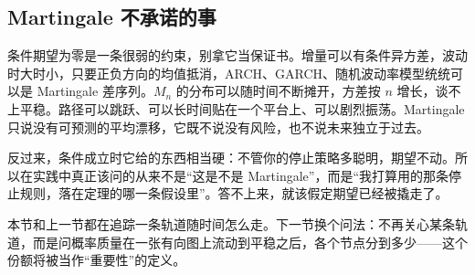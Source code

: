 \subsection{Martingale 不承诺的事}

条件期望为零是一条很弱的约束，别拿它当保证书。增量可以有条件异方差，波动时大时小，只要正负方向的均值抵消，ARCH、GARCH、随机波动率模型统统可以是 Martingale 差序列。\(M_n\) 的分布可以随时间不断摊开，方差按 \(n\) 增长，谈不上平稳。路径可以跳跃、可以长时间贴在一个平台上、可以剧烈振荡。Martingale 只说没有可预测的平均漂移，它既不说没有风险，也不说未来独立于过去。

反过来，条件成立时它给的东西相当硬：不管你的停止策略多聪明，期望不动。所以在实践中真正该问的从来不是``这是不是 Martingale''，而是``我打算用的那条停止规则，落在定理的哪一条假设里''。答不上来，就该假定期望已经被撬走了。

本节和上一节都在追踪一条轨道随时间怎么走。下一节换个问法：不再关心某条轨道，而是问概率质量在一张有向图上流动到平稳之后，各个节点分到多少——这个份额将被当作``重要性''的定义。

